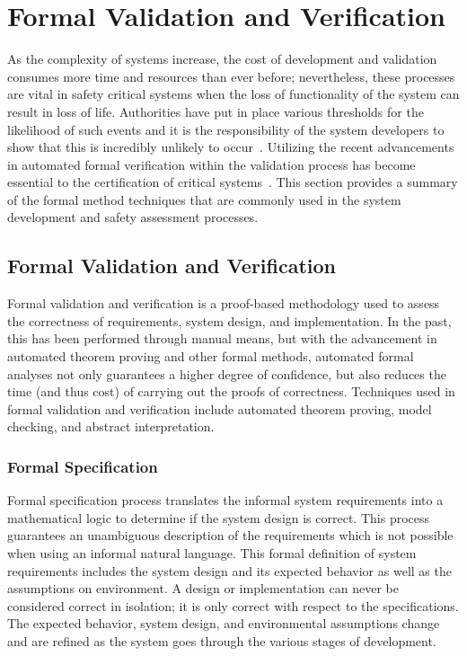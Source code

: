 \section{Formal Validation and Verification}
\label{sec:formalVV}
As the complexity of systems increase, the cost of development and validation consumes more time and resources than ever before; nevertheless, these processes are vital in safety critical systems when the loss of functionality of the system can result in loss of life. Authorities have put in place various thresholds for the likelihood of such events and it is the responsibility of the system developers to show that this is incredibly unlikely to occur~\cite{faaSA}. Utilizing the recent advancements in automated formal verification within the validation process has become essential to the certification of critical systems~\cite{deptOfDefense,standard1999,prasad2005survey}. This section provides a summary of the formal method techniques that are commonly used in the system development and safety assessment processes.

\subsection{Formal Validation and Verification}
Formal validation and verification is a proof-based methodology used to assess the correctness of requirements, system design, and implementation. In the past, this has been performed through manual means, but with the advancement in automated theorem proving and other formal methods, automated formal analyses not only guarantees a higher degree of confidence, but also reduces the time (and thus cost) of carrying out the proofs of correctness. Techniques used in formal validation and verification include automated theorem proving, model checking, and abstract interpretation. 

\subsubsection{Formal Specification}
Formal specification process translates the informal system requirements into a mathematical logic to determine if the system design is correct. This process guarantees an unambiguous description of the requirements which is not possible when using an informal natural language. This formal definition of system requirements includes the system design and its expected behavior as well as the assumptions on environment. A design or implementation can never be considered correct in isolation; it is only correct with respect to the specifications. The expected behavior, system design, and environmental assumptions change and are refined as the system goes through the various stages of development. 

